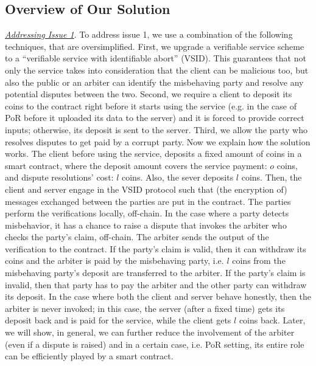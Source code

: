 
\subsection{Overview of Our Solution}

\noindent\underline{\textit{Addressing Issue 1}}. To address issue 1, we use a combination of the following techniques, that are oversimplified.  First, we upgrade a verifiable service scheme to a ``verifiable service with identifiable abort'' (VSID). This guarantees that not only the service  takes into  consideration that the client can  be malicious too, but also the public or an arbiter can identify the misbehaving party and resolve any potential disputes between the two. Second, we require a client to deposit its coins to the contract right before it starts using the service (e.g. in the case of PoR before it uploaded its data to the server) and it is forced to provide correct inputs; otherwise, its deposit is sent to the server.  Third, we allow the party who resolves disputes to get paid by a corrupt party. Now we explain how the solution works. The client before using the service, deposits  a fixed amount of coins in a smart contract, where the deposit amount covers the service payment: $o$ coins, and dispute resolutions' cost: $l$ coins. Also, the sever deposits  $l$ coins. Then, the client and server  engage in the   VSID protocol such that (the encryption of)  messages exchanged between the parties are put in the contract.  The parties perform the verifications locally, off-chain.  In the case where a party detects misbehavior, it  has a chance to raise a dispute that invokes the arbiter who  checks the party's claim, off-chain. The arbiter sends the output of the verification to the contract. If the party's claim is  valid, then it can withdraw its coins and the arbiter is paid by the misbehaving party, i.e. $l$ coins from the misbehaving party's deposit are transferred to the arbiter.  If the party's claim is invalid, then that party has to pay the arbiter and the other party can withdraw its deposit. In the case where both the client and server behave honestly, then the arbiter is never invoked;  in this case, the server (after a fixed time) gets its deposit back and is paid for the service, while  the client gets $l$ coins back.  Later, we will show, in general, we can further reduce the involvement of the arbiter (even if a dispute is raised) and in a certain case, i.e. PoR setting, its entire role can be efficiently played by a smart contract. 

